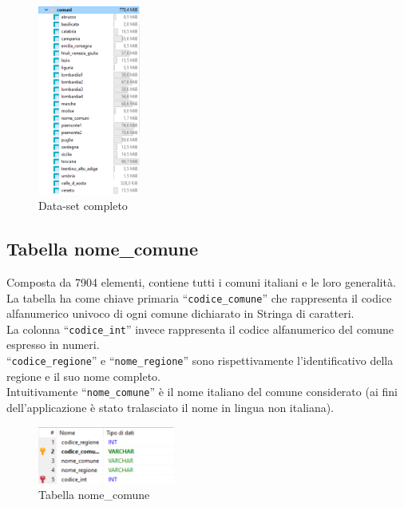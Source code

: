 \documentclass[a4paper,12pt]{report}
\begin{document}
\begin{figure}[h]
\begin{center}
\includegraphics[width=0.3\textwidth]{Images/DB.png} 
\caption{Data-set completo}
\end{center}
\end{figure}


\subsection{Tabella nome\_comune}
Composta da 7904 elementi, contiene tutti i comuni italiani e le loro generalità.\\
La tabella ha come chiave primaria ``\texttt{codice\_comune}'' che rappresenta il codice alfanumerico
univoco di ogni comune dichiarato in Stringa di caratteri.\\
La colonna ``\texttt{codice\_int}'' invece rappresenta il codice alfanumerico del comune espresso in numeri.\\
``\texttt{codice\_regione}'' e ``\texttt{nome\_regione}'' sono rispettivamente l'identificativo della regione
e il suo nome completo.\\
Intuitivamente ``\texttt{nome\_comune}'' è il nome italiano del comune considerato (ai fini dell'applicazione
è stato tralasciato il nome in lingua non italiana).
\begin{figure}[h]
\begin{center}
\includegraphics[width=0.4\textwidth]{Images/tabellaNomeComune.png}
\caption{Tabella nome\_comune}  
\end{center}
\end{figure}
\end{document}
